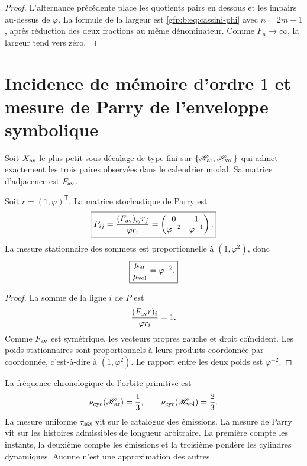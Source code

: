 \begin{proof}
L’alternance précédente place les quotients pairs en dessous et les impairs
au-dessus de \(\varphi\). La formule de la largeur est
\eqref{gfp:b:eq:cassini-phi} avec \(n=2m+1\), après réduction des deux fractions au
même dénominateur. Comme \(F_n\to\infty\), la largeur tend vers zéro.
\end{proof}

\section{Incidence de mémoire d’ordre \(1\) et mesure de Parry de l’enveloppe symbolique}

Soit \(X_{\rm av}\) le plus petit sous-décalage de type fini sur
\(\{\mathscr H_{\rm ar},\mathscr H_{\rm vol}\}\) qui admet exactement
les trois paires observées dans le calendrier modal. Sa matrice d’adjacence est
\(F_{\rm av}\).

\begin{theorem}
\label{gfp:b:thm:parry-phi}
Soit \(r=(1,\varphi)^{\mathsf T}\). La matrice stochastique de Parry est
\begin{equation}
 \boxed{
 P_{ij}=
 \frac{(F_{\rm av})_{ij}r_j}{\varphi r_i}
 =
 \begin{pmatrix}
 0&1\\
 \varphi^{-2}&\varphi^{-1}
 \end{pmatrix}.}
 \label{gfp:b:eq:parry-matriz-phi}
\end{equation}
La mesure stationnaire des sommets est proportionnelle à
\((1,\varphi^2)\), donc
\begin{equation}
 \boxed{
 \frac{\mu_{\rm ar}}{\mu_{\rm vol}}=\varphi^{-2}.}
 \label{gfp:b:eq:parry-razon-phi}
\end{equation}
\end{theorem}

\begin{proof}
La somme de la ligne \(i\) de \(P\) est
\[
 \frac{(F_{\rm av}r)_i}{\varphi r_i}=1.
\]
Comme \(F_{\rm av}\) est symétrique, les vecteurs propres gauche et droit
coïncident. Les poids stationnaires sont proportionnels à leurs produits
coordonnée par coordonnée, c’est-à-dire à \((1,\varphi^2)\). Le rapport entre les
deux poids est \(\varphi^{-2}\).
\end{proof}

\begin{remark}
La fréquence chronologique de l’orbite primitive est
\[
 \nu_{\rm cyc}(\mathscr H_{\rm ar})=\frac13,
 \qquad
 \nu_{\rm cyc}(\mathscr H_{\rm vol})=\frac23.
\]
La mesure uniforme \(\tau_{468}\) vit sur le catalogue des émissions. La
mesure de Parry vit sur les histoires admissibles de longueur arbitraire. La
première compte les instants, la deuxième compte les émissions et la troisième pondère
les cylindres dynamiques. Aucune n’est une approximation des autres.
\end{remark}

